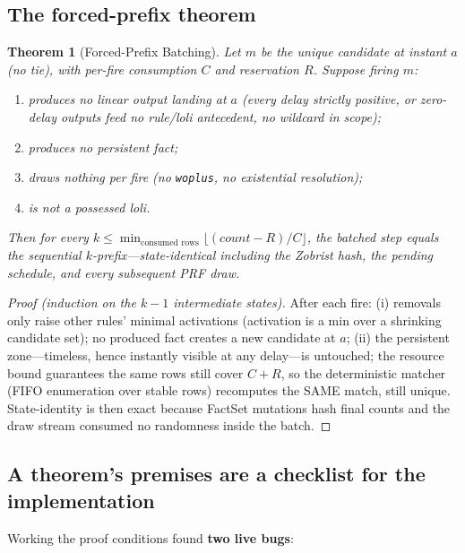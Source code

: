 \documentclass[11pt]{article}
\newtheorem{theorem}{Theorem}[section]
\theoremstyle{remark}
\begin{document}
\subsection{The forced-prefix theorem}
\label{sec:forced-prefix}

\begin{theorem}[Forced-Prefix Batching]
\label{thm:forced-prefix}
Let $m$ be the unique candidate at instant $a$ (no tie), with per-fire
consumption $C$ and reservation $R$.  Suppose firing $m$:
\begin{enumerate}[label=(\roman*)]
\item produces no linear output landing at $a$ (every delay strictly positive, or
  zero-delay outputs feed no rule/loli antecedent, no wildcard in scope);
\item produces no persistent fact;
\item draws nothing per fire (no \texttt{woplus}, no existential resolution);
\item is not a possessed loli.
\end{enumerate}
Then for every $k \leq \min_{\text{consumed rows}} \lfloor(\mathit{count} -
R)/C\rfloor$, the batched step equals the sequential $k$-prefix---state-identical
including the Zobrist hash, the pending schedule, and every subsequent PRF draw.
\end{theorem}

\begin{proof}[Proof (induction on the $k{-}1$ intermediate states)]
After each fire: (i) removals only raise other rules' minimal activations
(activation is a min over a shrinking candidate set); no produced fact creates a
new candidate at $a$; (ii) the persistent zone---timeless, hence instantly visible
at any delay---is untouched; the resource bound guarantees the same rows still
cover $C + R$, so the deterministic matcher (FIFO enumeration over stable rows)
recomputes the SAME match, still unique.  State-identity is then exact because
FactSet mutations hash final counts and the draw stream consumed no randomness
inside the batch.
\end{proof}

\subsection{A theorem's premises are a checklist for the implementation}
\label{sec:checklist}

Working the proof conditions found \textbf{two live bugs}:
\end{document}
